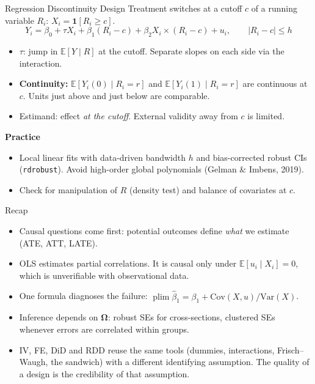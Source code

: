 \documentclass[9pt,aspectratio=169]{beamer}
\newcommand{\E}{\mathbb{E}}
\newcommand{\Var}{\mathrm{Var}}
\newcommand{\Cov}{\mathrm{Cov}}
\newcommand{\plim}{\operatorname{plim}}
\begin{document}
\begin{frame}{Regression Discontinuity Design}
\linespread{1.2}\selectfont
  Treatment switches at a cutoff $c$ of a running variable $R_i$: $X_i=\mathbf 1[R_i\geq c]$.
  \[
    Y_i=\beta_0+\tau X_i+\beta_1(R_i-c)+\beta_2 X_i\times(R_i-c)+u_i,\qquad |R_i-c|\leq h
  \]
  \begin{itemize}
    \item $\tau$: jump in $\E[Y\mid R]$ at the cutoff. Separate slopes on each side via the interaction.
    \item \textbf{Continuity:} $\E[Y_i(0)\mid R_i=r]$ and $\E[Y_i(1)\mid R_i=r]$ are continuous at $c$. Units just above and just below are comparable.
    \item Estimand: effect \emph{at the cutoff}. External validity away from $c$ is limited.
  \end{itemize}
  \medskip
  \textbf{Practice}
  \begin{itemize}
    \item Local linear fits with data-driven bandwidth $h$ and bias-corrected robust CIs (\texttt{rdrobust}). Avoid high-order global polynomials (Gelman \& Imbens, 2019).
    \item Check for manipulation of $R$ (density test) and balance of covariates at $c$.
  \end{itemize}
\end{frame}

\begin{frame}{Recap}
\linespread{1.2}\selectfont
  \begin{itemize}
    \item Causal questions come first: potential outcomes define \emph{what} we estimate (ATE, ATT, LATE).
    \item OLS estimates partial correlations. It is causal only under $\E[u_i\mid X_i]=0$, which is unverifiable with observational data.
    \item One formula diagnoses the failure: $\plim\hat\beta_1=\beta_1+\Cov(X,u)/\Var(X)$.
    \item Inference depends on $\bm\Omega$: robust SEs for cross-sections, clustered SEs whenever errors are correlated within groups.
    \item IV, FE, DiD and RDD reuse the same tools (dummies, interactions, Frisch--Waugh, the sandwich) with a different identifying assumption. The quality of a design is the credibility of that assumption.
  \end{itemize}
\end{frame}
\end{document}

